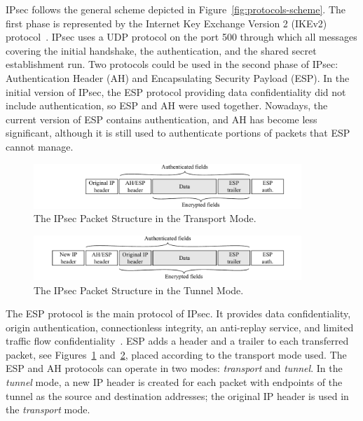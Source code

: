 IPsec follows the general scheme depicted in Figure~\ref{fig:protocols-scheme}. The first phase is represented by the Internet Key Exchange Version 2 (IKEv2) protocol~\cite{rfc5996}. IPsec uses a UDP protocol on the port 500 through which all messages covering the initial handshake, the authentication, and the shared secret establishment run. Two protocols could be used in the second phase of IPsec: Authentication Header (AH) and Encapsulating Security Payload (ESP). In the initial version of IPsec, the ESP protocol providing data confidentiality did not include authentication, so ESP and AH were used together. Nowadays, the current version of ESP contains authentication, and AH has become less significant, although it is still used to authenticate portions of packets that ESP cannot manage.



\begin{figure}[!ht]
  \centering
  \includegraphics[width=0.9\textwidth]{figures/paper-encrypted/ipsec_transport_mode}
  \caption{The IPsec Packet Structure in the Transport Mode.}
  \label{fig:ipsec-transport-mode}
\end{figure}

\begin{figure}[!ht]
  \centering
  \includegraphics[width=0.9\textwidth]{figures/paper-encrypted/ipsec_tunnel_mode}
  \caption{The IPsec Packet Structure in the Tunnel Mode.}
  \label{fig:ipsec-tunnel-mode}
\end{figure}

The ESP protocol is the main protocol of IPsec. It provides data confidentiality, origin authentication, connectionless integrity, an anti-replay service, and limited traffic flow confidentiality~\cite{rfc4303}. ESP adds a header and a trailer to each transferred packet, see Figures~\ref{fig:ipsec-transport-mode} and~\ref{fig:ipsec-tunnel-mode}, placed according to the transport mode used. The ESP and AH protocols can operate in two modes: \textit{transport} and \textit{tunnel}. In the \textit{tunnel} mode, a new IP header is created for each packet with endpoints of the tunnel as the source and destination addresses; the original IP header is used in the \textit{transport} mode.



